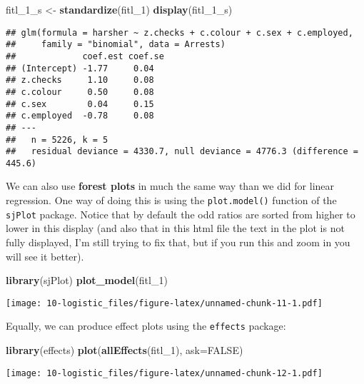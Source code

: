 \documentclass[
]{book}
\newenvironment{Shaded}{\begin{snugshade}}{\end{snugshade}}
\newcommand{\AttributeTok}[1]{\textcolor[rgb]{0.13,0.29,0.53}{#1}}
\newcommand{\ConstantTok}[1]{\textcolor[rgb]{0.56,0.35,0.01}{#1}}
\newcommand{\FunctionTok}[1]{\textcolor[rgb]{0.13,0.29,0.53}{\textbf{#1}}}
\newcommand{\NormalTok}[1]{#1}
\newcommand{\OtherTok}[1]{\textcolor[rgb]{0.56,0.35,0.01}{#1}}
\begin{document}
\begin{Shaded}
\begin{Highlighting}[]
\NormalTok{fitl\_1\_s }\OtherTok{\textless{}{-}} \FunctionTok{standardize}\NormalTok{(fitl\_1)}
\FunctionTok{display}\NormalTok{(fitl\_1\_s)}
\end{Highlighting}
\end{Shaded}

\begin{verbatim}
## glm(formula = harsher ~ z.checks + c.colour + c.sex + c.employed, 
##     family = "binomial", data = Arrests)
##             coef.est coef.se
## (Intercept) -1.77     0.04  
## z.checks     1.10     0.08  
## c.colour     0.50     0.08  
## c.sex        0.04     0.15  
## c.employed  -0.78     0.08  
## ---
##   n = 5226, k = 5
##   residual deviance = 4330.7, null deviance = 4776.3 (difference = 445.6)
\end{verbatim}

We can also use \textbf{forest plots} in much the same way than we did for linear regression. One way of doing this is using the \texttt{plot.model()} function of the \texttt{sjPlot} package. Notice that by default the odd ratios are sorted from higher to lower in this display (and also that in this html file the text in the plot is not fully displayed, I'm still trying to fix that, but if you run this and zoom in you will see it better).

\begin{Shaded}
\begin{Highlighting}[]
\FunctionTok{library}\NormalTok{(sjPlot)}
\FunctionTok{plot\_model}\NormalTok{(fitl\_1)}
\end{Highlighting}
\end{Shaded}

\texttt{[image: 10-logistic\_files/figure-latex/unnamed-chunk-11-1.pdf]}

Equally, we can produce effect plots using the \texttt{effects} package:

\begin{Shaded}
\begin{Highlighting}[]
\FunctionTok{library}\NormalTok{(effects)}
\FunctionTok{plot}\NormalTok{(}\FunctionTok{allEffects}\NormalTok{(fitl\_1), }\AttributeTok{ask=}\ConstantTok{FALSE}\NormalTok{)}
\end{Highlighting}
\end{Shaded}

\texttt{[image: 10-logistic\_files/figure-latex/unnamed-chunk-12-1.pdf]}
\end{document}
